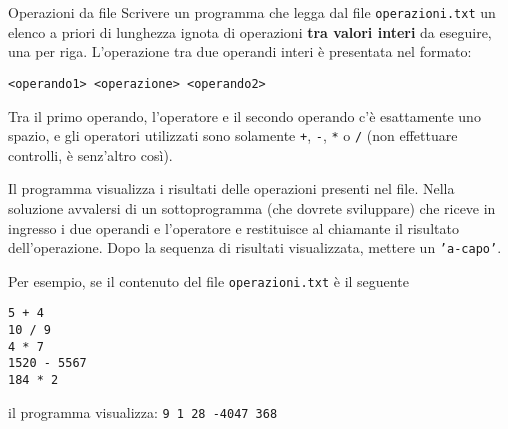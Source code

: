 \begin{labex}{Operazioni da file}
Scrivere un programma che legga dal file \texttt{operazioni.txt} un elenco a priori di lunghezza ignota di operazioni \textbf{tra valori interi} da eseguire, una per riga.
L'operazione tra due operandi interi \`e presentata nel formato:
\begin{verbatim}
<operando1> <operazione> <operando2>
\end{verbatim}
Tra il primo operando, l'operatore e il secondo operando c'\`e esattamente uno spazio, e gli operatori utilizzati sono solamente \texttt{+}, \texttt{-}, \texttt{*} o \texttt{/} (non effettuare controlli, \`e senz'altro cos\`i).

Il programma visualizza i risultati delle operazioni presenti nel file. 
Nella soluzione avvalersi di un sottoprogramma (che dovrete sviluppare) che riceve in ingresso i due operandi e l'operatore e restituisce al chiamante il risultato dell'operazione.
Dopo la sequenza di risultati visualizzata, mettere un \texttt{'a-capo'}.

Per esempio, se il contenuto del file \texttt{operazioni.txt} \`e il seguente

\begin{verbatim}
5 + 4
10 / 9
4 * 7 
1520 - 5567
184 * 2
\end{verbatim}

il programma visualizza: \texttt{9 1 28 -4047 368}

\begin{labexinout}
\end{labexinout}


\end{labex}

